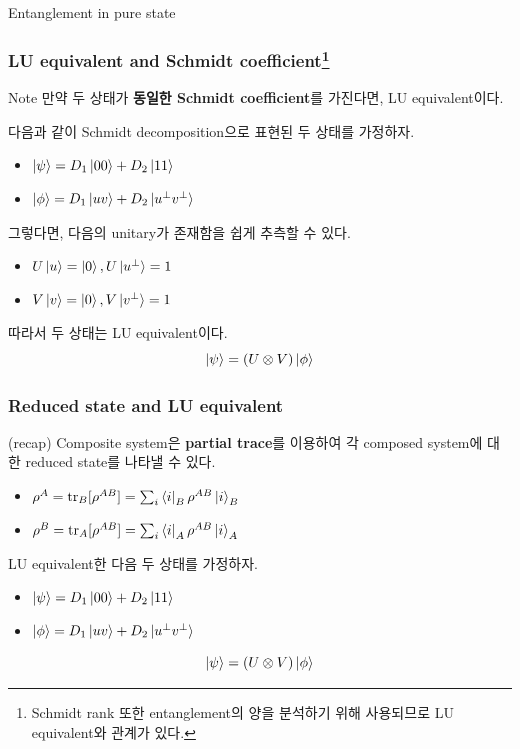\documentclass[9pt]{beamer}
\begin{document}
\begin{section}{Entanglement in pure state}
        \begin{frame}
            \frametitle{LU equivalent and Schmidt coefficient\footnote{Schmidt rank 또한 entanglement의 양을 분석하기 위해 사용되므로 LU equivalent와 관계가 있다.}}
            \begin{block}{Note}
                만약 두 상태가 \textbf{동일한 Schmidt coefficient}를 가진다면, LU equivalent이다.
            \end{block}
            \vspace{0.2cm}
            다음과 같이 Schmidt decomposition으로 표현된 두 상태를 가정하자.
            \begin{itemize}
                \item $\ket{\psi} = D_1 \ket{00} + D_2 \ket{11}$
                \item $\ket{\phi} = D_1 \ket{uv} + D_2 \ket{u^\perp v^\perp}$
            \end{itemize}
            \vspace{0.2cm}
            그렇다면, 다음의 unitary가 존재함을 쉽게 추측할 수 있다.
            \begin{itemize}
                \item $U \ket{u} = \ket 0, U\ket{u^\perp} = 1$
                \item $V \ket{v} = \ket 0, V\ket{v^\perp} = 1$
            \end{itemize}
            \vspace{0.2cm}
            따라서 두 상태는 LU equivalent이다.
            \begin{equation*}
                \ket{\psi} = (U \otimes V) \ket{\phi}
            \end{equation*}
        \end{frame}


        \begin{frame}
            \frametitle{Reduced state and LU equivalent}
            (recap) Composite system은 \textbf{partial trace}를 이용하여 각 composed system에 대한 reduced state를 나타낼 수 있다.
            \begin{itemize}
                \item $\rho^A = \text{tr}_B [\rho^{AB}] = \sum_i \bra i_B \rho^{AB} \ket i_B$
                \item $\rho^B = \text{tr}_A [\rho^{AB}] = \sum_i \bra i_A \rho^{AB} \ket i_A$
            \end{itemize}
            \vspace{0.4cm}
            LU equivalent한 다음 두 상태를 가정하자.
            \begin{itemize}
                \item $\ket{\psi} = D_1 \ket{00} + D_2 \ket{11}$
                \item $\ket{\phi} = D_1 \ket{uv} + D_2 \ket{u^\perp v^\perp}$
            \end{itemize}
            \begin{equation*}
                \ket{\psi} = (U \otimes V) \ket{\phi}
            \end{equation*}


\end{frame}
\end{section}
\end{document}
